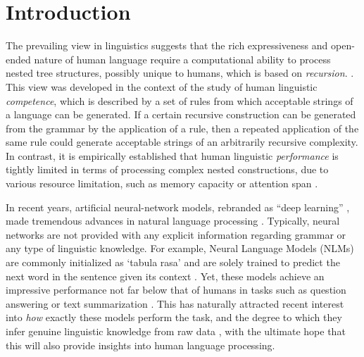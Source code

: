 \section{Introduction}
The prevailing view in linguistics suggests that the rich
expressiveness and open-ended nature of human language require a
computational ability to process nested tree structures, possibly
unique to humans, which is based on
\textit{recursion}. \citep{Chomsky:1957, Hauser:etal:2002,
  Dehaene:etal:2015}. This view was developed in the context of the
study of human linguistic \textit{competence}, which is described by a
set of rules from which acceptable strings of a language can be
generated. If a certain recursive construction can be generated from
the grammar by the application of a rule, then a repeated application
of the same rule could generate acceptable strings of an arbitrarily
recursive complexity. In contrast, it is empirically established that
human linguistic \textit{performance} is tightly limited in terms of
processing complex nested constructions, due to various resource
limitation, such as memory capacity or attention span \citep{}.

In recent years, artificial neural-network models, rebranded as ``deep learning'' \citep{LeCun:etal:2015}, made tremendous advances in natural language processing \citep{Goldberg:2017}. Typically, neural networks are not provided with any explicit information regarding grammar or any type of linguistic knowledge. For example, Neural Language Models (NLMs) are commonly initialized as `tabula rasa' and are solely trained to predict the next word in the sentence given its context \citep{Elman:1990}. Yet, these models achieve an impressive performance not far below that of humans in tasks such as question answering or text summarization \citep{Radford:etal:2019}. This has naturally attracted recent interest into \textit{how} exactly these models perform the task, and the degree to which they infer genuine linguistic knowledge from raw data  \citep{}, with the ultimate hope that this will also provide insights into human language processing. 

